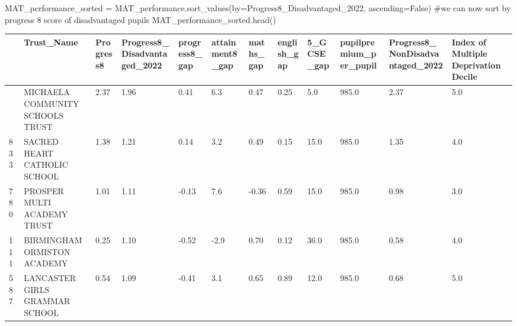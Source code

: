 \documentclass[
  letterpaper,
  DIV=11,
  numbers=noendperiod]{scrartcl}
\newenvironment{Shaded}{\begin{snugshade}}{\end{snugshade}}
\newcommand{\CommentTok}[1]{\textcolor[rgb]{0.37,0.37,0.37}{#1}}
\newcommand{\NormalTok}[1]{\textcolor[rgb]{0.00,0.23,0.31}{#1}}
\newcommand{\OperatorTok}[1]{\textcolor[rgb]{0.37,0.37,0.37}{#1}}
\newcommand{\StringTok}[1]{\textcolor[rgb]{0.13,0.47,0.30}{#1}}
\newcommand{\VariableTok}[1]{\textcolor[rgb]{0.07,0.07,0.07}{#1}}
\begin{document}
\begin{Shaded}
\begin{Highlighting}[]
\NormalTok{MAT\_performance\_sorted }\OperatorTok{=}\NormalTok{ MAT\_performance.sort\_values(by}\OperatorTok{=}\StringTok{\textquotesingle{}Progress8\_Disadvantaged\_2022\textquotesingle{}}\NormalTok{, ascending}\OperatorTok{=}\VariableTok{False}\NormalTok{)}
\CommentTok{\#we can now sort by progress 8 score of disadvantaged pupils}
\NormalTok{MAT\_performance\_sorted.head()}

\end{Highlighting}
\end{Shaded}

\begin{longtable}[]{@{}llllllllllll@{}}
\toprule\noalign{}
& Trust\_Name & Progress8 & Progress8\_Disadvantaged\_2022 &
progress8\_gap & attainment8\_gap & maths\_gap & english\_gap &
5\_GCSE\_gap & pupilpremium\_per\_pupil &
Progress8\_NonDisadvantaged\_2022 & Index of Multiple Deprivation
Decile \\
\midrule\noalign{}
\endhead
\bottomrule\noalign{}
\endlastfoot
654 & MICHAELA COMMUNITY SCHOOLS TRUST & 2.37 & 1.96 & 0.41 & 6.3 & 0.47
& 0.25 & 5.0 & 985.0 & 2.37 & 5.0 \\
833 & SACRED HEART CATHOLIC SCHOOL & 1.38 & 1.21 & 0.14 & 3.2 & 0.49 &
0.15 & 15.0 & 985.0 & 1.35 & 4.0 \\
780 & PROSPER MULTI ACADEMY TRUST & 1.01 & 1.11 & -0.13 & 7.6 & -0.36 &
0.59 & 15.0 & 985.0 & 0.98 & 3.0 \\
111 & BIRMINGHAM ORMISTON ACADEMY & 0.25 & 1.10 & -0.52 & -2.9 & 0.70 &
0.12 & 36.0 & 985.0 & 0.58 & 4.0 \\
587 & LANCASTER GIRLS\textquotesingle{} GRAMMAR SCHOOL & 0.54 & 1.09 &
-0.41 & 3.1 & 0.65 & 0.89 & 12.0 & 985.0 & 0.68 & 5.0 \\
\end{longtable}
\end{document}
